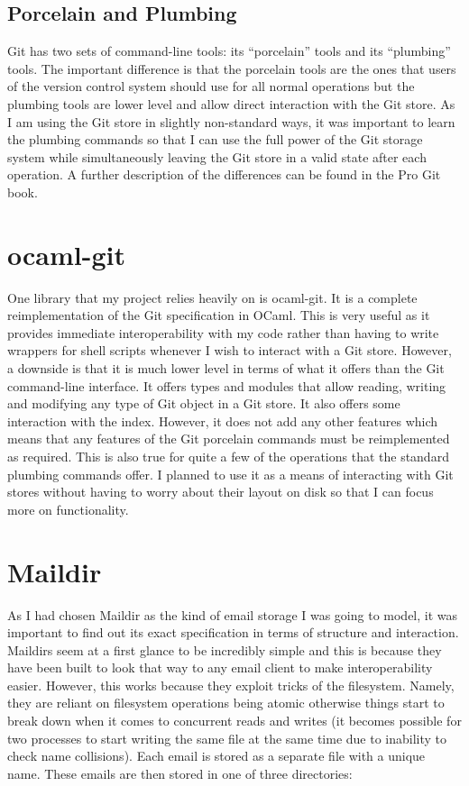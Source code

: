 \subsection{Porcelain and Plumbing}

Git has two sets of command-line tools: its ``porcelain'' tools and its ``plumbing'' tools. The important difference is that the porcelain tools are the ones that users of the version control system should use for all normal operations but the plumbing tools are lower level and allow direct interaction with the Git store. As I am using the Git store in slightly non-standard ways, it was important to learn the plumbing commands so that I can use the full power of the Git storage system while simultaneously leaving the Git store in a valid state after each operation. A further description of the differences can be found in the Pro Git book\cite{chacon2014git}.

\section{ocaml-git}

One library that my project relies heavily on is ocaml-git\cite{code_ocaml-git}. It is a complete reimplementation of the Git specification in OCaml. This is very useful as it provides immediate interoperability with my code rather than having to write wrappers for shell scripts whenever I wish to interact with a Git store. However, a downside is that it is much lower level in terms of what it offers than the Git command-line interface. It offers types and modules that allow reading, writing and modifying any type of Git object in a Git store. It also offers some interaction with the index. However, it does not add any other features which means that any features of the Git porcelain commands must be reimplemented as required. This is also true for quite a few of the operations that the standard plumbing commands offer. I planned to use it as a means of interacting with Git stores without having to worry about their layout on disk so that I can focus more on functionality.

\section{Maildir}

As I had chosen Maildir as the kind of email storage I was going to model, it was important to find out its exact specification in terms of structure and interaction. Maildirs seem at a first glance to be incredibly simple and this is because they have been built to look that way to any email client to make interoperability easier. However, this works because they exploit tricks of the filesystem. Namely, they are reliant on filesystem operations being atomic otherwise things start to break down when it comes to concurrent reads and writes (it becomes possible for two processes to start writing the same file at the same time due to inability to check name collisions).
Each email is stored as a separate file with a unique name. These emails are then stored in one of three directories:

